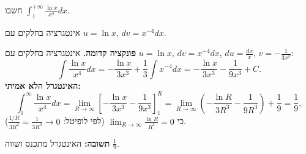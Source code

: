 
\begin{question}
חשבו $\displaystyle\int_1^{+\infty}\frac{\ln x}{x^4}dx$.
\end{question}

\begin{hint}
אינטגרציה בחלקים עם $u=\ln x$, $dv=x^{-4}dx$.
\end{hint}

\begin{solution}
\textbf{פונקציה קדומה.} אינטגרציה בחלקים עם $u=\ln x$, $dv=x^{-4}dx$, $du=\frac{dx}x$, $v=-\frac1{3x^3}$:
\[
\int\frac{\ln x}{x^4}dx=-\frac{\ln x}{3x^3}+\frac13\int x^{-4}dx=-\frac{\ln x}{3x^3}-\frac1{9x^3}+C.
\]
\textbf{האינטגרל הלא אמיתי:}
\[
\int_1^{\infty}\frac{\ln x}{x^4}dx=\lim_{R\to\infty}\left[-\frac{\ln x}{3x^3}-\frac{1}{9x^3}\right]_1^R
=\lim_{R\to\infty}\left(-\frac{\ln R}{3R^3}-\frac1{9R^3}\right)+\frac19=\frac19,
\]
כי $\lim_{R\to\infty}\frac{\ln R}{R^3}=0$ (לפי לופיטל: $\frac{1/R}{3R^2}=\frac1{3R^3}\to0$).

\textbf{תשובה:} האינטגרל מתכנס ושווה $\frac19$.
\end{solution}
